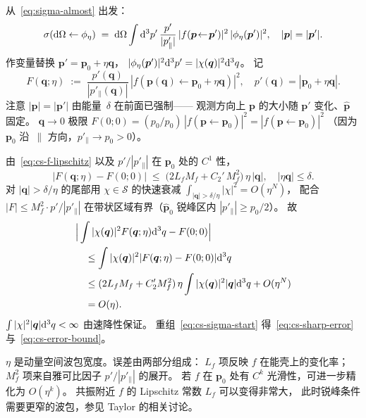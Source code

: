 \begin{proof*}
从~\eqref{eq:sigma-almost} 出发：
\begin{equation}
\sigma(\mathrm{d}\Omega\leftarrow\phi_\eta)
\;=\; \mathrm{d}\Omega\int \mathrm{d}^3 p'\,\frac{p'}{|p'_\parallel|}\,
|f(\bm{p}\!\leftarrow\!\bm{p}')|^2\,|\phi_\eta(\bm{p}')|^2,
\quad |\bm{p}|=|\bm{p}'|.
\label{eq:cs-sigma-start}
\end{equation}
作变量替换 $\bm{p}' = \bm{p}_0 + \eta \bm{q}$，
$|\phi_\eta(\bm{p}')|^2\mathrm{d}^3 p' = |\chi(\bm{q})|^2\mathrm{d}^3 q$。
记
\begin{equation}
F(\bm{q};\eta) \;:=\; \frac{p'(\bm{q})}{|p'_\parallel(\bm{q})|}\,
|f(\bm{p}(\bm{q})\!\leftarrow\!\bm{p}_0+\eta\bm{q})|^2,
\quad p'(\bm{q}) = |\bm{p}_0+\eta\bm{q}|.
\end{equation}
注意 $|\bm{p}|=|\bm{p}'|$ 由能量~$\delta$ 在前面已强制——
观测方向上 $\bm{p}$ 的大小随 $\bm{p}'$ 变化、$\hat{\bm{p}}$ 固定。
$\bm{q}\to 0$ 极限 $F(0;0) = (p_0/p_0)\,|f(\bm{p}\!\leftarrow\!\bm{p}_0)|^2 = |f(\bm{p}\!\leftarrow\!\bm{p}_0)|^2$
（因为 $\bm{p}_0$ 沿~$\parallel$ 方向，$p'_\parallel\to p_0 > 0$）。

由~\eqref{eq:cs-f-lipschitz} 以及 $p'/|p'_\parallel|$ 在 $\bm{p}_0$ 处的 $C^1$ 性，
\begin{equation}
\big|F(\bm{q};\eta) - F(0;0)\big| \;\leq\; \big(2 L_f M_f + C_2'\,M_f^2\big)\,\eta\,|\bm{q}|,
\quad |\eta\bm{q}|\leq\delta.
\label{eq:cs-F-lip}
\end{equation}
对 $|\bm{q}|>\delta/\eta$ 的尾部用 $\chi\in\mathcal{S}$ 的快速衰减
$\int_{|\bm{q}|>\delta/\eta}|\chi|^2 = O(\eta^N)$，
配合 $|F|\leq M_f^2 \cdot p'/|p'_\parallel|$ 在带状区域有界（$\hat{\bm{p}}_0$ 锐峰区内 $|p'_\parallel|\geq p_0/2$）。
故
\begin{align}
&\Big|\int |\chi(\bm{q})|^2 F(\bm{q};\eta)\mathrm{d}^3 q - F(0;0)\Big| \nonumber\\
&\quad\leq \int |\chi(\bm{q})|^2 |F(\bm{q};\eta)-F(0;0)|\mathrm{d}^3 q \nonumber\\
&\quad\leq (2L_f M_f + C_2' M_f^2)\,\eta \int |\chi(\bm{q})|^2|\bm{q}|\mathrm{d}^3 q + O(\eta^N)\\
&\quad= O(\eta).\nonumber
\end{align}
$\int|\chi|^2|\bm{q}|\mathrm{d}^3 q < \infty$ 由速降性保证。
重组~\eqref{eq:cs-sigma-start} 得~\eqref{eq:cs-sharp-error} 与~\eqref{eq:cs-error-bound}。
\end{proof*}

\begin{remark}[误差量级解读]
$\eta$ 是动量空间波包宽度。误差由两部分组成：
$L_f$ 项反映 $f$ 在能壳上的变化率；
$M_f^2$ 项来自雅可比因子 $p'/|p'_\parallel|$ 的展开。
若 $f$ 在 $\bm{p}_0$ 处有 $C^k$ 光滑性，可进一步精化为 $O(\eta^k)$。
共振附近 $f$ 的 Lipschitz 常数 $L_f$ 可以变得非常大，
此时锐峰条件需要更窄的波包，参见 Taylor 的相关讨论。
\end{remark}


